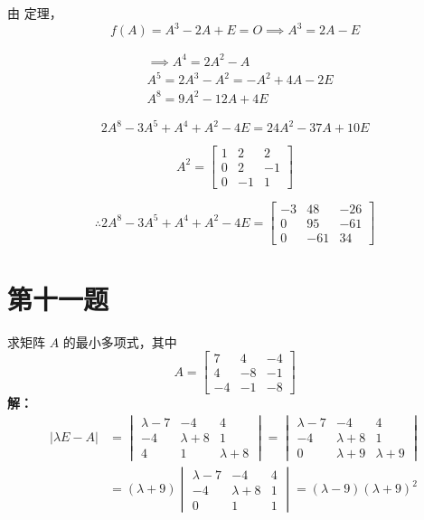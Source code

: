 \documentclass{article}
\begin{document}
由  定理，
\[
f(A) = A^3 - 2A + E = O \implies A^3 = 2A - E
\]

\[
\begin{aligned}
&\implies A^4 = 2A^2 - A \\
&A^5 = 2A^3 - A^2 = -A^2 + 4A - 2E \\
&A^8 = 9A^2 - 12A + 4E
\end{aligned}
\]

\[
2A^8 - 3A^5 + A^4 + A^2 - 4E = 24A^2 - 37A + 10E
\]

\[
A^2 = \begin{bmatrix}
1 & 2 & 2 \\
0 & 2 & -1 \\
0 & -1 & 1
\end{bmatrix}
\]

\[
\therefore 2A^8 - 3A^5 + A^4 + A^2 - 4E = 
\begin{bmatrix}
-3 & 48 & -26 \\
0 & 95 & -61 \\
0 & -61 & 34
\end{bmatrix}
\]

\newpage
\section{第十一题}\noindent
求矩阵 $A$ 的最小多项式，其中
\[
A = \begin{bmatrix}
7 & 4 & -4 \\
4 & -8 & -1 \\
-4 & -1 & -8
\end{bmatrix}
\]
\textbf{解：}
\[
\begin{aligned}
|\lambda E - A| &= \begin{vmatrix}
\lambda - 7 & -4 & 4 \\
-4 & \lambda + 8 & 1 \\
4 & 1 & \lambda + 8
\end{vmatrix}
= \begin{vmatrix}
\lambda - 7 & -4 & 4 \\
-4 & \lambda + 8 & 1 \\
0 & \lambda + 9 & \lambda + 9
\end{vmatrix} \\
&= (\lambda + 9) \begin{vmatrix}
\lambda - 7 & -4 & 4 \\
-4 & \lambda + 8 & 1 \\
0 & 1 & 1
\end{vmatrix}
= (\lambda - 9)(\lambda + 9)^2
\end{aligned}
\]
\end{document}
